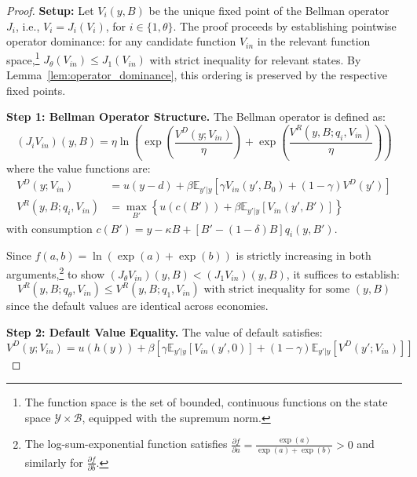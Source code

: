 \documentclass[12pt]{article}
\theoremstyle{plain}
\begin{document}
\begin{proof}
	\textbf{Setup:} Let $V_i(y, B)$ be the unique fixed point of the Bellman operator $J_i$, i.e., $V_i = J_i(V_i)$, for $i \in \{1, \theta\}$. The proof proceeds by establishing pointwise operator dominance: for any candidate function $V_{in}$ in the relevant function space,\footnote{The function space is the set of bounded, continuous functions on the state space $\mathcal{Y} \times \mathcal{B}$, equipped with the supremum norm.} $J_\theta(V_{in}) \leq J_1(V_{in})$ with strict inequality for relevant states. By Lemma~\ref{lem:operator_dominance}, this ordering is preserved by the respective fixed points.

	\textbf{Step 1: Bellman Operator Structure.} The Bellman operator is defined as:
	\begin{equation}
		(J_i V_{in})(y, B) = \eta \ln\left( \exp\left(\frac{V^D(y; V_{in})}{\eta}\right) + \exp\left(\frac{V^R(y, B; q_i, V_{in})}{\eta}\right) \right) \label{eq:bellman_operator}
	\end{equation}
	where the value functions are:
	\begin{align}
		V^D(y; V_{in})         & = u(y-d) + \beta \mathbb{E}_{y'|y}[\gamma V_{in}(y', B_0) + (1-\gamma) V^D(y')] \label{eq:default_value_def}   \\
		V^R(y, B; q_i, V_{in}) & = \max_{B'} \left\{ u(c(B')) + \beta \mathbb{E}_{y'|y}[V_{in}(y', B')] \right\} \label{eq:repayment_value_def}
	\end{align}
	with consumption $c(B') = y - \kappa B + [B' - (1-\delta)B]q_i(y, B')$.

	Since $f(a,b) = \ln(\exp(a) + \exp(b))$ is strictly increasing in both
	arguments,\footnote{The log-sum-exponential function satisfies $\frac{\partial
				f}{\partial a} = \frac{\exp(a)}{\exp(a) + \exp(b)} > 0$ and similarly for
		$\frac{\partial f}{\partial b}$.} to show $(J_\theta V_{in})(y,B) < (J_1
		V_{in})(y,B)$, it suffices to establish:
	\begin{equation}
		V^R(y, B; q_\theta, V_{in}) \leq V^R(y, B; q_1, V_{in}) \text{ with strict inequality for some } (y,B) \label{eq:sufficient_condition}
	\end{equation}
	since the default values are identical across economies.

	\textbf{Step 2: Default Value Equality.} The value of default satisfies:
	\begin{equation}
		V^D(y; V_{in}) = u(h(y)) + \beta \left[ \gamma \mathbb{E}_{y'|y}[V_{in}(y', 0)] + (1-\gamma) \mathbb{E}_{y'|y}[V^D(y'; V_{in})] \right] \label{eq:default_value_recursive}
	\end{equation}


\end{proof}
\end{document}
